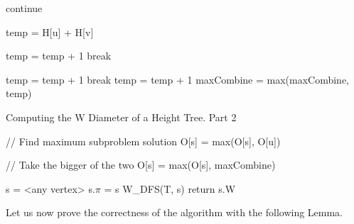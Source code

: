 \begin{algorithm}{}
\begin{algorithmic}[1]
                \State continue
            \EndIf

            \State temp = H[u] + H[v]

                        \State temp = temp + 1
                        \State break
                    \EndIf
                \EndFor
            \EndIf

                        \State temp = temp + 1
                        \State break
                    \EndIf
                \EndFor
            \EndIf
                \State temp = temp + 1
            \EndIf
            \State maxCombine = max(maxCombine, temp)
        \EndFor

    \EndFor

\end{algorithmic}
\end{algorithm}

\begin{algorithm}{}
\caption{Computing the W Diameter of a Height Tree. Part 2}
\begin{algorithmic}[1]

    \State // Find maximum subproblem solution
        \State O[s] = max(O[s], O[u])
    \EndFor

    \State // Take the bigger of the two
    \State O[s] = max(O[s], maxCombine)


    \State s = <any vertex>
    \State s.$\pi$ = s
    \State W\_DFS(T, s)
    \State return s.W
\EndFunction

\end{algorithmic}
\end{algorithm}


Let us now prove the correctness of the algorithm with the following Lemma.

